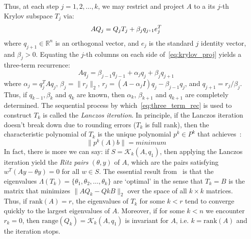 \documentclass[10pt]{article}
\newcommand{\+}{%
	\raisebox{0.18ex}{\scaleobj{0.55}{+}}
}
\begin{document}
Thus, at each step $j = 1, 2, \dots, k$, we may restrict and project $A$ to a its $j$-th Krylov subspace $T_j$ via: 
\begin{equation}\label{eq:krylov_proj}
	A Q_j = Q_j T_j + \beta_j q_{j\+1} e_{j}^T
\end{equation}
where $q_{j+1} \in \mathbb{R}^n$ is an orthogonal vector, and $e_{j}$ is the standard $j$ identity vector, and $\beta_j > 0$.
Equating the $j$-th columns on each side of~\eqref{eq:krylov_proj} yields a three-term recurrence: 
\begin{equation}\label{eq:three_term_rec}
	A q_j = \beta_{j-1} q_{j-1} + \alpha_j q_j + \beta_{j} q_{j+1}
\end{equation}
where $\alpha_j = q_j^T A q_j$, $\beta_j = \lVert r_j \rVert_2$, $r_j = (A - \alpha_j I)q_j - \beta_{j-1} q_j$, and $q_{j+1} = r_j / \beta_j$. Thus, if $q_{k-1}, \beta_k$ and $q_k$ are known, then $\alpha_k$, $\beta_{k+1}$ and $q_{k+1}$ are completely determined.
The sequential process by which~\eqref{eq:three_term_rec} is used to construct $T_k$ is called the \emph{Lanczos iteration}. 
In principle, if the Lanczos iteration doesn't break down due to rounding errors ($T_k$ is full rank), then the characteristic polynomial of $T_k$ is the unique polynomial $p^k \in P^k$ that achieves~\cite{}:
\begin{equation}
	\lVert p^k(A)b \rVert = {minimum}
\end{equation}
In fact, there is more we can say: if $S = \mathcal{K}_k(A, q_1)$, then applying the Lanczos iteration yield the \emph{Ritz pairs} $(\theta, y)$ of $A$, which are the pairs satisfying $w^T (Ay - \theta y) = 0$ for all $w \in S$.
The essential result from~\cite{} is that the eigenvalues $\Lambda(T_k) = \{\theta_1, \theta_2, \dots, \theta_k \}$ are `optimal' in the sense that $T_k = B$ is the matrix that minimizes  $\lVert A Q_k - Qk B \rVert_2$ over the space of all $k \times k$ matrices. Thus, if $\mathrm{rank}(A) = r$, the eigenvalues of $T_k$ for some $k < r$ tend to converge quickly to the largest eigenvalues of $A$. Moreover, if for some $k < n$ we encounter $r_k = 0$, then $\mathrm{range}(Q_k) = \mathcal{K}_k(A, q_1)$ is invariant for $A$, i.e. $k = \mathrm{rank}(A)$ and the iteration stops. 
\end{document}
